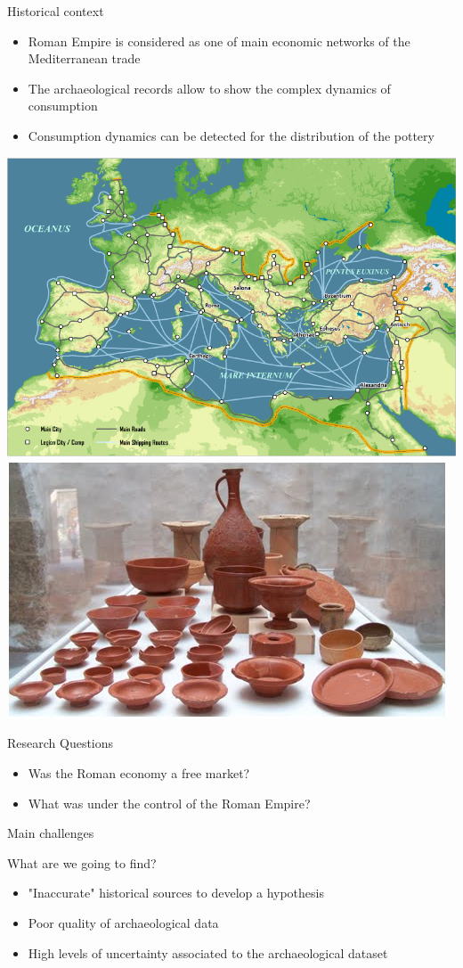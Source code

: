 \documentclass[12pt, handout=show,notes=show]{beamer}
\begin{document}
\begin{frame}{Historical context}

\vfil
\begin{itemize}
\item Roman Empire is considered as one of main economic networks of the Mediterranean trade
\item The archaeological records allow to show the complex dynamics of consumption
\item Consumption dynamics can be detected for the distribution of the pottery

\end{itemize}

\begin{center}
		\includegraphics[height=0.23\textwidth]{./romanempire.png}
	   \hfil \includegraphics[height=0.23\textwidth]{./vajilla.jpg}
		
\end{center}

\end{frame}

\begin{frame}{Research Questions}
\begin{itemize}
\item
\Large Was the Roman economy a free market?\\
\item
\Large What was under the control of the Roman Empire? 
\end{itemize}

\end{frame}


\begin{frame}{Main challenges}

What are we going to find?\\
\vspace{0.5cm}
\begin{itemize}
\item "Inaccurate" historical sources to develop a hypothesis 
\item Poor quality of archaeological data
\item High levels of uncertainty associated to the archaeological dataset
\end{itemize}

\end{frame}
\end{document}
